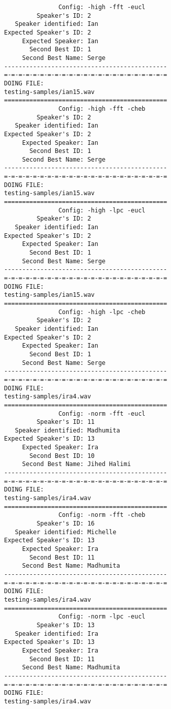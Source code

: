 \begin{verbatim}
               Config: -high -fft -eucl
         Speaker's ID: 2
   Speaker identified: Ian
Expected Speaker's ID: 2
     Expected Speaker: Ian
       Second Best ID: 1
     Second Best Name: Serge
---------------------------------------------
=-=-=-=-=-=-=-=-=-=-=-=-=-=-=-=-=-=-=-=-=-=-=
DOING FILE:
testing-samples/ian15.wav
=============================================
               Config: -high -fft -cheb
         Speaker's ID: 2
   Speaker identified: Ian
Expected Speaker's ID: 2
     Expected Speaker: Ian
       Second Best ID: 1
     Second Best Name: Serge
---------------------------------------------
=-=-=-=-=-=-=-=-=-=-=-=-=-=-=-=-=-=-=-=-=-=-=
DOING FILE:
testing-samples/ian15.wav
=============================================
               Config: -high -lpc -eucl
         Speaker's ID: 2
   Speaker identified: Ian
Expected Speaker's ID: 2
     Expected Speaker: Ian
       Second Best ID: 1
     Second Best Name: Serge
---------------------------------------------
=-=-=-=-=-=-=-=-=-=-=-=-=-=-=-=-=-=-=-=-=-=-=
DOING FILE:
testing-samples/ian15.wav
=============================================
               Config: -high -lpc -cheb
         Speaker's ID: 2
   Speaker identified: Ian
Expected Speaker's ID: 2
     Expected Speaker: Ian
       Second Best ID: 1
     Second Best Name: Serge
---------------------------------------------
=-=-=-=-=-=-=-=-=-=-=-=-=-=-=-=-=-=-=-=-=-=-=
DOING FILE:
testing-samples/ira4.wav
=============================================
               Config: -norm -fft -eucl
         Speaker's ID: 11
   Speaker identified: Madhumita
Expected Speaker's ID: 13
     Expected Speaker: Ira
       Second Best ID: 10
     Second Best Name: Jihed Halimi
---------------------------------------------
=-=-=-=-=-=-=-=-=-=-=-=-=-=-=-=-=-=-=-=-=-=-=
DOING FILE:
testing-samples/ira4.wav
=============================================
               Config: -norm -fft -cheb
         Speaker's ID: 16
   Speaker identified: Michelle
Expected Speaker's ID: 13
     Expected Speaker: Ira
       Second Best ID: 11
     Second Best Name: Madhumita
---------------------------------------------
=-=-=-=-=-=-=-=-=-=-=-=-=-=-=-=-=-=-=-=-=-=-=
DOING FILE:
testing-samples/ira4.wav
=============================================
               Config: -norm -lpc -eucl
         Speaker's ID: 13
   Speaker identified: Ira
Expected Speaker's ID: 13
     Expected Speaker: Ira
       Second Best ID: 11
     Second Best Name: Madhumita
---------------------------------------------
=-=-=-=-=-=-=-=-=-=-=-=-=-=-=-=-=-=-=-=-=-=-=
DOING FILE:
testing-samples/ira4.wav

\end{verbatim}

